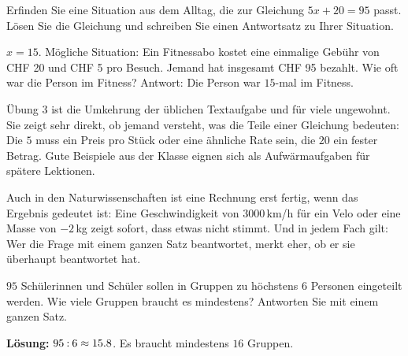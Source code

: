 \documentclass[11pt]{exam}
\begin{document}
\begin{questions}
\question Erfinden Sie eine Situation aus dem Alltag, die zur Gleichung
$5x + 20 = 95$ passt. Lösen Sie die Gleichung und schreiben Sie einen
Antwortsatz zu Ihrer Situation.
\begin{solution}
  $x = 15$. Mögliche Situation: Ein Fitnessabo kostet eine einmalige Gebühr
  von CHF 20 und CHF 5 pro Besuch. Jemand hat insgesamt CHF 95 bezahlt. Wie oft
  war die Person im Fitness? Antwort: Die Person war $15$-mal im Fitness.
\end{solution}
\raum{4cm}

\end{questions}

\begin{lehrperson}[Übung 3]
Übung 3 ist die Umkehrung der üblichen Textaufgabe und für viele
ungewohnt. Sie zeigt sehr direkt, ob jemand versteht, was die Teile einer
Gleichung bedeuten: Die $5$ muss ein Preis pro Stück oder eine ähnliche
Rate sein, die $20$ ein fester Betrag. Gute Beispiele aus der Klasse eignen
sich als Aufwärmaufgaben für spätere Lektionen.
\end{lehrperson}

\begin{transfer}
Auch in den Naturwissenschaften ist eine Rechnung erst fertig, wenn das
Ergebnis gedeutet ist: Eine Geschwindigkeit von $3000$\,km/h für ein Velo
oder eine Masse von $-2$\,kg zeigt sofort, dass etwas nicht stimmt. Und in
jedem Fach gilt: Wer die Frage mit einem ganzen Satz beantwortet, merkt eher,
ob er sie überhaupt beantwortet hat.
\end{transfer}

\begin{exitfrage}
$95$ Schülerinnen und Schüler sollen in Gruppen zu höchstens $6$ Personen
eingeteilt werden. Wie viele Gruppen braucht es mindestens? Antworten Sie mit
einem ganzen Satz.
\ifprintanswers\par\medskip\textbf{Lösung:} $95 \mathbin{:} 6 \approx 15.8$. Es
braucht mindestens $16$ Gruppen.
\else\par\vspace{1.5cm}\fi
\end{exitfrage}
\end{document}
